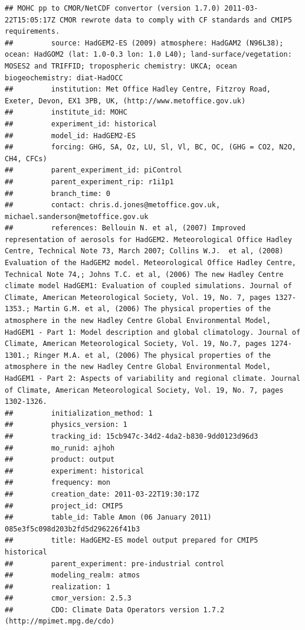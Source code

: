 \documentclass[]{book}
\begin{document}
\begin{verbatim}
## MOHC pp to CMOR/NetCDF convertor (version 1.7.0) 2011-03-22T15:05:17Z CMOR rewrote data to comply with CF standards and CMIP5 requirements.
##         source: HadGEM2-ES (2009) atmosphere: HadGAM2 (N96L38); ocean: HadGOM2 (lat: 1.0-0.3 lon: 1.0 L40); land-surface/vegetation: MOSES2 and TRIFFID; tropospheric chemistry: UKCA; ocean biogeochemistry: diat-HadOCC
##         institution: Met Office Hadley Centre, Fitzroy Road, Exeter, Devon, EX1 3PB, UK, (http://www.metoffice.gov.uk)
##         institute_id: MOHC
##         experiment_id: historical
##         model_id: HadGEM2-ES
##         forcing: GHG, SA, Oz, LU, Sl, Vl, BC, OC, (GHG = CO2, N2O, CH4, CFCs)
##         parent_experiment_id: piControl
##         parent_experiment_rip: r1i1p1
##         branch_time: 0
##         contact: chris.d.jones@metoffice.gov.uk, michael.sanderson@metoffice.gov.uk
##         references: Bellouin N. et al, (2007) Improved representation of aerosols for HadGEM2. Meteorological Office Hadley Centre, Technical Note 73, March 2007; Collins W.J.  et al, (2008) Evaluation of the HadGEM2 model. Meteorological Office Hadley Centre, Technical Note 74,; Johns T.C. et al, (2006) The new Hadley Centre climate model HadGEM1: Evaluation of coupled simulations. Journal of Climate, American Meteorological Society, Vol. 19, No. 7, pages 1327-1353.; Martin G.M. et al, (2006) The physical properties of the atmosphere in the new Hadley Centre Global Environmental Model, HadGEM1 - Part 1: Model description and global climatology. Journal of Climate, American Meteorological Society, Vol. 19, No.7, pages 1274-1301.; Ringer M.A. et al, (2006) The physical properties of the atmosphere in the new Hadley Centre Global Environmental Model, HadGEM1 - Part 2: Aspects of variability and regional climate. Journal of Climate, American Meteorological Society, Vol. 19, No. 7, pages 1302-1326.
##         initialization_method: 1
##         physics_version: 1
##         tracking_id: 15cb947c-34d2-4da2-b830-9dd0123d96d3
##         mo_runid: ajhoh
##         product: output
##         experiment: historical
##         frequency: mon
##         creation_date: 2011-03-22T19:30:17Z
##         project_id: CMIP5
##         table_id: Table Amon (06 January 2011) 085e3f5c098d203b2fd5d296226f41b3
##         title: HadGEM2-ES model output prepared for CMIP5 historical
##         parent_experiment: pre-industrial control
##         modeling_realm: atmos
##         realization: 1
##         cmor_version: 2.5.3
##         CDO: Climate Data Operators version 1.7.2 (http://mpimet.mpg.de/cdo)
\end{verbatim}
\end{document}
